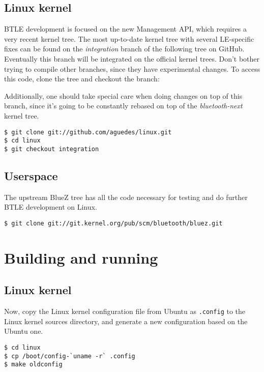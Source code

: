 \documentclass[11pt]{article}
\begin{document}
\subsection{Linux kernel}

BTLE development is focused on the new Management API, which requires a very
recent kernel tree. The most up-to-date kernel tree with several LE-specific
fixes can be found on the {\em integration} branch of the following tree on
GitHub. Eventually this branch will be integrated on the official kernel trees.
Don't bother trying to compile other branches, since they have experimental
changes. To access this code, clone the tree and checkout the branch:

Additionally, one should take special care when doing changes on top of this
branch, since it's going to be constantly rebased on top of the {\em
bluetooth-next} kernel tree.

\begin{verbatim}
$ git clone git://github.com/aguedes/linux.git
$ cd linux
$ git checkout integration
\end{verbatim}

\subsection{Userspace}

The upstream BlueZ tree has all the code necessary for testing and do further
BTLE development on Linux.

\begin{verbatim}
$ git clone git://git.kernel.org/pub/scm/bluetooth/bluez.git
\end{verbatim}

\section{Building and running}

\subsection{Linux kernel}

Now, copy the Linux kernel configuration file from Ubuntu as \verb|.config| to
the Linux kernel sources directory, and generate a new configuration based on
the Ubuntu one.

\begin{verbatim}
$ cd linux
$ cp /boot/config-`uname -r` .config
$ make oldconfig
\end{verbatim}
\end{document}
